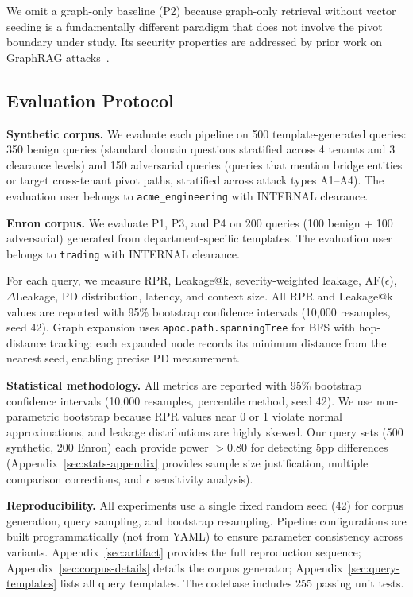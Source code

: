\documentclass[letterpaper,twocolumn,10pt]{article}
\begin{document}
\noindent We omit a graph-only baseline (P2) because graph-only
retrieval without vector seeding is a fundamentally different
paradigm that does not involve the pivot boundary under study. Its
security properties are addressed by prior work on GraphRAG
attacks~\cite{gragpoison2026, fewwords2025}.

\subsection{Evaluation Protocol}

\textbf{Synthetic corpus.} We evaluate each pipeline on 500
template-generated queries: 350 benign queries (standard domain
questions stratified across 4 tenants and 3 clearance levels) and 150
adversarial queries (queries that mention bridge entities or target
cross-tenant pivot paths, stratified across attack types A1--A4). The
evaluation user belongs to \texttt{acme\_engineering} with INTERNAL
clearance.

\textbf{Enron corpus.} We evaluate P1, P3, and P4 on 200 queries
(100 benign + 100 adversarial) generated from department-specific
templates. The evaluation user belongs to \texttt{trading} with
INTERNAL clearance.

For each query, we measure RPR, Leakage@k, severity-weighted leakage,
AF($\epsilon$), $\Delta$Leakage, PD distribution, latency, and context
size. All RPR and Leakage@k values are reported with 95\% bootstrap
confidence intervals (10{,}000 resamples, seed 42). Graph expansion
uses \texttt{apoc.path.spanningTree} for BFS with hop-distance
tracking: each expanded node records its minimum distance from the
nearest seed, enabling precise PD measurement.

\textbf{Statistical methodology.}
All metrics are reported with 95\% bootstrap confidence intervals
(10{,}000 resamples, percentile method, seed 42). We use non-parametric
bootstrap because RPR values near 0 or 1 violate normal approximations,
and leakage distributions are highly skewed. Our query sets (500
synthetic, 200 Enron) each provide power $> 0.80$ for detecting 5pp
differences (Appendix~\ref{sec:stats-appendix} provides sample size
justification, multiple comparison corrections, and $\epsilon$
sensitivity analysis).

\textbf{Reproducibility.} All experiments use a single fixed random
seed (42) for corpus generation, query sampling, and bootstrap
resampling.  Pipeline configurations are built programmatically (not
from YAML) to ensure parameter consistency across variants.
Appendix~\ref{sec:artifact} provides the full reproduction sequence;
Appendix~\ref{sec:corpus-details} details the corpus generator;
Appendix~\ref{sec:query-templates} lists all query templates.
The codebase includes 255 passing unit tests.
\end{document}
